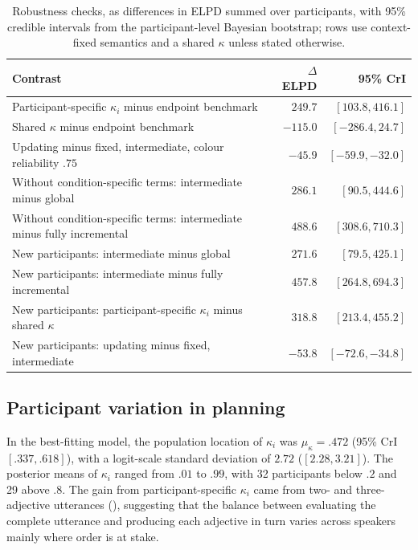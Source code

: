 \documentclass[10pt,a4paper,fleqn]{article}
\begin{document}
\begin{table}[!htbp]
\centering
\small
\caption{Robustness checks, as differences in ELPD summed over participants, with 95\% credible intervals from the participant-level Bayesian bootstrap; rows use context-fixed semantics and a shared $\kappa$ unless stated otherwise.}
\label{tab:robustness-checks}
\begin{tabularx}{\textwidth}{X r r}
\toprule
Contrast & $\Delta$ELPD & 95\% CrI \\
\midrule
Participant-specific $\kappa_i$ minus endpoint benchmark & $249.7$ & $[103.8, 416.1]$ \\
Shared $\kappa$ minus endpoint benchmark & $-115.0$ & $[-286.4, 24.7]$ \\
\addlinespace
Updating minus fixed, intermediate, colour reliability $.75$ & $-45.9$ & $[-59.9, -32.0]$ \\
\addlinespace
Without condition-specific terms: intermediate minus global & $286.1$ & $[90.5, 444.6]$ \\
Without condition-specific terms: intermediate minus fully incremental & $488.6$ & $[308.6, 710.3]$ \\
\addlinespace
New participants: intermediate minus global & $271.6$ & $[79.5, 425.1]$ \\
New participants: intermediate minus fully incremental & $457.8$ & $[264.8, 694.3]$ \\
New participants: participant-specific $\kappa_i$ minus shared $\kappa$ & $318.8$ & $[213.4, 455.2]$ \\
New participants: updating minus fixed, intermediate & $-53.8$ & $[-72.6, -34.8]$ \\
\bottomrule
\end{tabularx}
\end{table}

\subsection{Participant variation in planning}

In the best-fitting model, the population location of $\kappa_i$ was $\mu_\kappa=.472$ (95\% CrI $[.337,.618]$), with a logit-scale standard deviation of $2.72$ ($[2.28,3.21]$).
The posterior means of $\kappa_i$ ranged from $.01$ to $.99$, with 32 participants below $.2$ and 29 above $.8$.
The gain from participant-specific $\kappa_i$ came from two- and three-adjective utterances (), suggesting that the balance between evaluating the complete utterance and producing each adjective in turn varies across speakers mainly where order is at stake.
\end{document}
